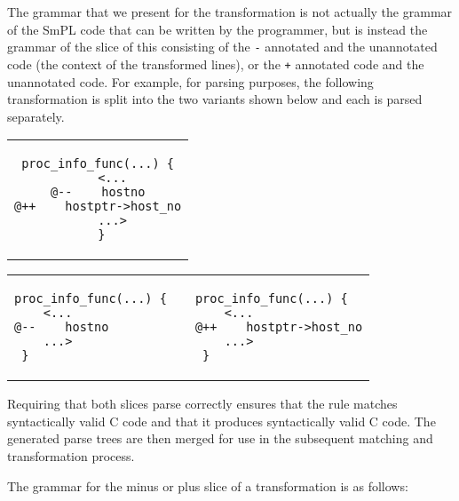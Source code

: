 The grammar that we present for the transformation is not actually the
grammar of the SmPL code that can be written by the programmer, but is
instead the grammar of the slice of this consisting of the {\tt -}
annotated and the unannotated code (the context of the transformed lines),
or the {\tt +} annotated code and the unannotated code.  For example, for
parsing purposes, the following transformation
is split into the two variants shown below and each is parsed
separately.

\begin{center}
\begin{tabular}{c}
\begin{lstlisting}[language=Cocci]
  proc_info_func(...) {
    <...
@--    hostno
@++    hostptr->host_no
    ...>
 }
\end{lstlisting}\\
\end{tabular}
\end{center}

{%
\begin{center}
\begin{tabular}{p{5cm}p{3cm}p{5cm}}
\begin{lstlisting}[language=Cocci]
  proc_info_func(...) {
    <...
@--    hostno
    ...>
 }
\end{lstlisting}
&&
\begin{lstlisting}[language=Cocci]
  proc_info_func(...) {
    <...
@++    hostptr->host_no
    ...>
 }
\end{lstlisting}
\end{tabular}
\end{center}
}

\noindent
Requiring that both slices parse correctly ensures that the rule matches
syntactically valid C code and that it produces syntactically valid C code.
The generated parse trees are then merged for use in the subsequent
matching and transformation process.

The grammar for the minus or plus slice of a transformation is as follows:

